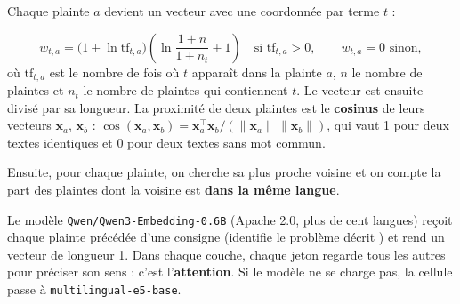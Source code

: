 \begin{stepbox}[title={2.1\quad TF-IDF, et à quoi ressemblent les plus proches voisins}]
Chaque plainte $a$ devient un vecteur avec une coordonnée par terme $t$ :
\begin{formulabox}
\[
w_{t,a} = \bigl(1 + \ln \mathrm{tf}_{t,a}\bigr)\left(\ln\frac{1+n}{1+n_t} + 1\right)
\quad\text{si } \mathrm{tf}_{t,a} > 0, \qquad w_{t,a} = 0 \text{ sinon},
\]
où $\mathrm{tf}_{t,a}$ est le nombre de fois où $t$ apparaît dans la plainte $a$, $n$ le nombre de plaintes et
$n_t$ le nombre de plaintes qui contiennent $t$. Le vecteur est ensuite divisé par sa longueur. La
proximité de deux plaintes est le \textbf{cosinus} de leurs vecteurs $\mathbf{x}_a$, $\mathbf{x}_b$ :
$\cos(\mathbf{x}_a,\mathbf{x}_b) = \mathbf{x}_a^{\top}\mathbf{x}_b / (\lVert\mathbf{x}_a\rVert\,\lVert\mathbf{x}_b\rVert)$,
qui vaut 1 pour deux textes identiques et 0 pour deux textes sans mot commun.
\end{formulabox}
Ensuite, pour chaque plainte, on cherche sa plus proche voisine et on compte la part des plaintes dont la
voisine est \textbf{dans la même langue}.
\end{stepbox}

\begin{stepbox}[title={2.2\quad Plongements multilingues : un transformer qui lit la plainte}]
\begin{center}
\end{center}
Le modèle \texttt{Qwen/Qwen3-Embedding-0.6B} (Apache 2.0, plus de cent langues) reçoit chaque plainte
précédée d'une consigne (\og identifie le problème décrit \fg) et rend un vecteur de longueur 1. Dans
chaque couche, chaque jeton \og regarde \fg{} tous les autres pour préciser son sens : c'est
l'\textbf{attention}. Si le modèle ne se charge pas, la cellule passe à \texttt{multilingual-e5-base}.
\end{stepbox}

